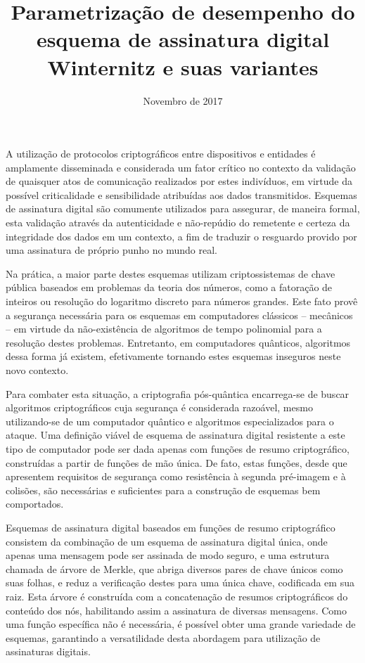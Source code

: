 \documentclass{article}
\title{Parametrização de desempenho do esquema de
assinatura digital Winternitz e suas variantes}
\author{Novembro de 2017}
\date{}
\begin{document}
\maketitle


A utilização de protocolos criptográficos entre dispositivos e entidades
é amplamente disseminada e considerada um fator crítico no contexto da
validação de quaisquer atos de comunicação realizados por estes indivíduos,
em virtude da possível criticalidade e sensibilidade atribuídas aos dados
transmitidos. Esquemas de assinatura digital são comumente utilizados para
assegurar, de maneira formal, esta validação através da autenticidade e
não-repúdio do remetente e certeza da integridade dos dados em um contexto,
a fim de traduzir o resguardo provido por uma assinatura de próprio punho
no mundo real.

Na prática, a maior parte destes esquemas utilizam criptossistemas de
chave pública baseados em problemas da teoria dos números, como a
fatoração de inteiros ou resolução do logaritmo discreto para números
grandes. Este fato provê a segurança necessária para os esquemas em
computadores clássicos -- mecânicos -- em virtude da não-existência de
algoritmos de tempo polinomial para a resolução destes problemas.
Entretanto, em computadores quânticos, algoritmos dessa forma já existem,
efetivamente tornando estes esquemas inseguros neste novo contexto.

Para combater esta situação, a criptografia pós-quântica encarrega-se
de buscar algoritmos criptográficos cuja segurança é considerada razoável,
mesmo utilizando-se de um computador quântico e algoritmos especializados
para o ataque. Uma definição viável de esquema de assinatura digital
resistente a este tipo de computador pode ser dada apenas com funções de
resumo criptográfico, construídas a partir de funções de mão única. De fato,
estas funções, desde que apresentem requisitos de segurança como resistência
à segunda pré-imagem e à colisões, são necessárias e suficientes para a
construção de esquemas bem comportados.

Esquemas de assinatura digital baseados em funções de resumo criptográfico
consistem da combinação de um esquema de assinatura digital única, onde
apenas uma mensagem pode ser assinada de modo seguro, e uma estrutura
chamada de árvore de Merkle, que abriga diversos pares de chave únicos
como suas folhas, e reduz a verificação destes para uma única chave,
codificada em sua raiz. Esta árvore é construída com a concatenação de
resumos criptográficos do conteúdo dos nós, habilitando assim a assinatura
de diversas mensagens. Como uma função específica não é necessária, é
possível obter uma grande variedade de esquemas, garantindo a versatilidade
desta abordagem para utilização de assinaturas digitais.
\end{document}
